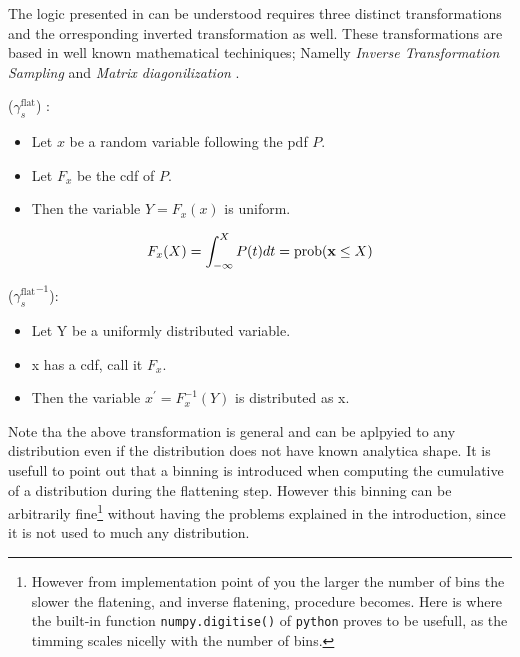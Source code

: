 The logic presented in \figref{} can be understood requires three distinct transformations and the orresponding
inverted transformation as well. These transformations are based in well known mathematical techiniques; Namelly
{ \it Inverse Transformation Sampling} \cite{} and {\it Matrix diagonilization} \cite{}.

\vspace{1cm}

 ($\gamma_s^{\text{flat}}$) :
\begin{center}
\begin{itemize}
\item Let $x$ be a random variable following the pdf $P$.
\item Let $F_x$ be the cdf of $P$.
\item Then the variable $Y=F_x(x)$ is uniform.
\end{itemize}
\end{center}

\begin{equation}
F_x(X) = \int_{-\infty}^X P(t)dt  = \text{prob}({\bf x} \leq X) \nonumber
\end{equation}

 (${\gamma_s^{\text{flat}}}^{-1}$):
\begin{center}
\begin{itemize}
\item Let Y be a uniformly distributed variable.
\item x has a cdf, call it $F_x$.
\item Then the variable $x^\prime = F_x^{-1}(Y)$ is distributed as x.
\end{itemize}
\end{center}

Note tha the above transformation is general and can be aplpyied to any distribution
even if the distribution does not have known analytica shape.
It is usefull to point out that a binning is introduced when computing the cumulative of a
distribution during the flattening step. However this binning can be arbitrarily fine\footnote{However
from implementation point of you the larger the number of bins the slower the flatening, and inverse flatening,
procedure becomes. Here is where the built-in function {\tt numpy.digitise()} of {\tt python} proves to be
usefull, as the timming scales nicelly with the number of bins.} without  having the problems explained
in the introduction, since it is not used to much any distribution.

